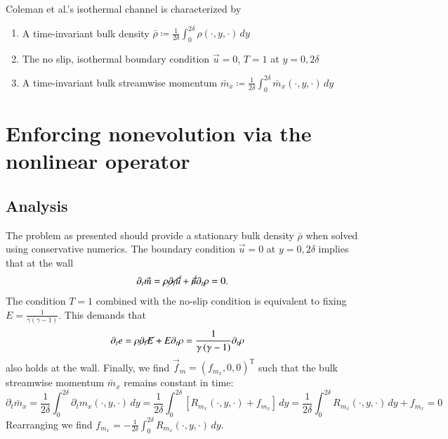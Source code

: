 \documentclass[letterpaper,11pt,nointlimits,reqno]{amsart}
\begin{document}
Coleman et al.'s isothermal channel is characterized by
\begin{enumerate}
  \item A time-invariant bulk density $\bar{\rho} \coloneqq \frac{1}{2\delta}
        \int_{0}^{2\delta} \rho\!\left(\cdot,y,\cdot\right)\,dy $
  \item The no slip, isothermal boundary condition
        $\vec{u}=0$, $T = 1$ at $y = 0,2\delta$
  \item A time-invariant bulk streamwise momentum
        $\bar{m}_{x} \coloneqq \frac{1}{2\delta}
        \int_{0}^{2\delta} \bar{m}_{x}\!\left(\cdot,y,\cdot\right)\,dy $
\end{enumerate}


\section{Enforcing nonevolution via the nonlinear operator}

\subsection{Analysis}

The problem as presented should provide a stationary bulk density $\bar{\rho}$
when solved using conservative numerics.  The boundary condition $\vec{u} = 0$
at $y = 0,2\delta$ implies that at the wall
\begin{align}
  \partial_{t} \vec{m}
  =   \rho \cancel{\partial_{t} \vec{u}}
    + \cancel{\vec{u}} \partial_{t} \rho
  = 0.
\end{align}
The condition $T=1$ combined with the no-slip condition is equivalent to fixing
${E}=\frac{1}{\gamma\left(\gamma-1\right)}$.  This demands that
\begin{align}
  \partial_{t} e
  &=  \rho \cancel{\partial_{t} {E}}
    + {E} \partial_{t} \rho
  = \frac{1}{\gamma\left(\gamma-1\right)} \partial_{t} \rho
\end{align}
also holds at the wall.  Finally, we find $\vec{f}_{m} =
\left(f_{m_x},0,0\right)^{\textrm{T}}$ such that the bulk streamwise momentum
$\bar{m}_{x}$ remains constant in time:
\begin{equation}
  \partial_{t} \bar{m}_x
   = \frac{1}{2\delta} \int_{0}^{2\delta}
     \partial_{t} m_{x} \!\left(\cdot,y,\cdot\right) \, dy
   = \frac{1}{2\delta} \int_{0}^{2\delta}
     \left[  R_{m_x}\!\left(\cdot,y,\cdot\right) + f_{m_x} \right] \, dy
   = \frac{1}{2\delta} \int_{0}^{2\delta}
     R_{m_x}\!\left(\cdot,y,\cdot\right) \, dy + f_{m_x}
   = 0
\end{equation}
Rearranging we find $f_{m_x} = - \frac{1}{2\delta}
\int_{0}^{2\delta} R_{m_x}\!\left(\cdot,y,\cdot\right) \, dy$.
\end{document}

